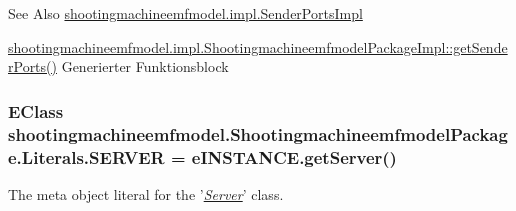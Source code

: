 \begin{DoxySeeAlso}{See Also}
\hyperlink{classshootingmachineemfmodel_1_1impl_1_1_sender_ports_impl}{shootingmachineemfmodel.\-impl.\-Sender\-Ports\-Impl} 

\hyperlink{classshootingmachineemfmodel_1_1impl_1_1_shootingmachineemfmodel_package_impl_a65cf0393c49f9556064a7d50a35b56a1}{shootingmachineemfmodel.\-impl.\-Shootingmachineemfmodel\-Package\-Impl\-::get\-Sender\-Ports()} Generierter Funktionsblock 
\end{DoxySeeAlso}
\hypertarget{interfaceshootingmachineemfmodel_1_1_shootingmachineemfmodel_package_1_1_literals_a1036dfbc9612abd79064026db37b0a33}{
\subsubsection[{S\-E\-R\-V\-E\-R}]{\setlength{\rightskip}{0pt plus 5cm}E\-Class shootingmachineemfmodel.\-Shootingmachineemfmodel\-Package.\-Literals.\-S\-E\-R\-V\-E\-R = e\-I\-N\-S\-T\-A\-N\-C\-E.\-get\-Server()}}\label{interfaceshootingmachineemfmodel_1_1_shootingmachineemfmodel_package_1_1_literals_a1036dfbc9612abd79064026db37b0a33}
The meta object literal for the '\hyperlink{classshootingmachineemfmodel_1_1impl_1_1_server_impl}{{\itshape Server}}' class.

